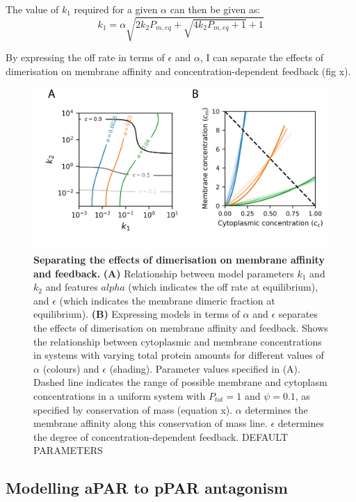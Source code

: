 \documentclass[12pt]{"report"}
\newcommand{\mycaption}[2]{\caption[#1]{\textbf{#1.} #2}}
\begin{document}
The value of $k_1$ required for a given $\alpha$ can then be given as:
\begin{equation}
k_1 = \alpha \sqrt{2 k_2 P_{m, eq} + \sqrt{4 k_2 P_{m, eq} + 1 } + 1}
\end{equation}

By expressing the off rate in terms of $\epsilon$ and $\alpha$, I can separate the effects of dimerisation on membrane affinity and concentration-dependent feedback (fig x).\\

\begin{figure}
\includegraphics[scale=1]{epsilon_vs_koff}
\centering
\mycaption{Separating the effects of dimerisation on membrane affinity and feedback}{
\textbf{(A)} Relationship between model parameters $k_1$ and $k_2$ and features $alpha$  (which indicates the off rate at equilibrium), and $\epsilon$ (which indicates the membrane dimeric fraction at equilibrium).
\textbf{(B)} Expressing models in terms of $\alpha$ and $\epsilon$ separates the effects of dimerisation on membrane affinity and feedback. Shows the relationship between cytoplasmic and membrane concentrations in systems with varying total protein amounts for different values of $\alpha$ (colours) and $\epsilon$ (shading). Parameter values specified in (A). Dashed line indicates the range of possible membrane and cytoplasm concentrations in a uniform system with $P_{tot}  = 1$ and $\psi = 0.1$, as specified by conservation of mass (equation x). $\alpha$ determines the membrane affinity along this conservation of mass line. $\epsilon$ determines the degree of concentration-dependent feedback. DEFAULT PARAMETERS
}
\label{fig:epsilon_vs_koff}
\end{figure}


\clearpage
\subsection{Modelling aPAR to pPAR antagonism}
\end{document}
